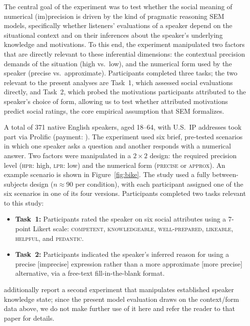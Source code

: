 \documentclass[12pt,a4paper]{article}
\newcommand{\xvar}[1]{\textsc{#1}}
\begin{document}
The central goal of the experiment was to test whether the social meaning of
numerical (im)precision is driven by the kind of pragmatic reasoning SEM
models, specifically whether listeners' evaluations of a speaker depend on
the situational context and on their inferences about the speaker's underlying
knowledge and motivations. To this end, the experiment manipulated two factors
that are directly relevant to these inferential dimensions: the contextual
precision demands of the situation (high vs.\ low), and the numerical form used
by the speaker (precise vs.\ approximate). Participants completed three tasks;
the two relevant to the present analyses are Task~1, which assessed social
evaluations directly, and Task~2, which probed the motivations participants
attributed to the speaker's choice of form, allowing us to test whether
attributed motivations predict social ratings, the core empirical assumption
that SEM formalizes.

A total of 371 native English speakers, aged 18--64, with U.S.~IP addresses took
part via Prolific (payment: ). The experiment used six brief,
pre-tested scenarios in which one speaker asks a question and another responds
with a numerical answer. Two factors were manipulated in a $2 \times 2$ design:
the required precision level (\xvar{hpr}: high, \xvar{lpr}: low) and the
numerical form (\xvar{precise} or \xvar{approx}). An example scenario is shown
in Figure~\ref{fig:bike}. The study used a fully between-subjects design ($n
\approx 90$ per condition), with each participant assigned one of the six
scenarios in one of its four versions. Participants completed two tasks relevant
to this study:

\begin{itemize}
\item \textbf{Task~1:} Participants rated the speaker on six social attributes
using a 7-point Likert scale: \xvar{competent}, \xvar{knowledgeable},
\xvar{well-prepared}, \xvar{likeable}, \xvar{helpful}, and \xvar{pedantic}.

\item \textbf{Task~2:} Participants indicated the speaker's inferred reason for
using a precise [imprecise] expression rather than a more approximate [more
precise] alternative, via a free-text fill-in-the-blank format.
\end{itemize}

\citet{soltEtAl2025} additionally report a second experiment that manipulates
established speaker knowledge state; since the present model evaluation draws on
the context/form data above, we do not make further use of it here and refer the
reader to that paper for details.
\end{document}

